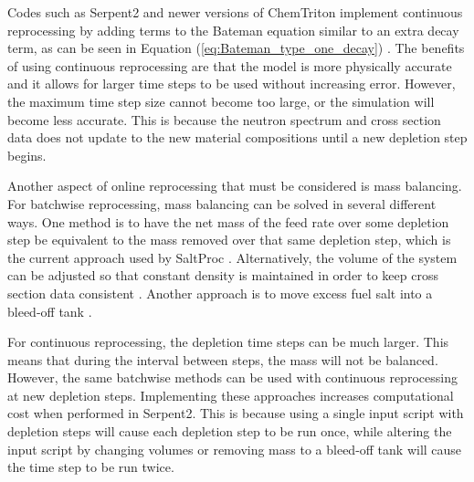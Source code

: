 Codes such as Serpent2 and newer versions of ChemTriton implement continuous reprocessing by adding terms to the Bateman equation similar to an extra decay term, as can be seen in Equation (\ref{eq:Bateman_type_one_decay}) \cite{aufiero_extended_2013, jr_vicente_valdez_modeling_2020}. The benefits of using continuous reprocessing are that the model is more physically accurate and it allows for larger time steps to be used without increasing error. However, the maximum time step size cannot become too large, or the simulation will become less accurate. This is because the neutron spectrum and cross section data does not update to the new material compositions until a new depletion step begins. 

Another aspect of online reprocessing that must be considered is mass balancing. For batchwise reprocessing, mass balancing can be solved in several different ways. One method is to have the net mass of the feed rate over some depletion step be equivalent to the mass removed over that same depletion step, which is the current approach used by SaltProc \cite{rykhlevskii_modeling_2019}. Alternatively, the volume of the system can be adjusted so that constant density is maintained in order to keep cross section data consistent \cite{ridley_method_2017}. Another approach is to move excess fuel salt into a bleed-off tank \cite{ridley_method_2017}.

For continuous reprocessing, the depletion time steps can be much larger. This means that during the interval between steps, the mass will not be balanced. However, the same batchwise methods can be used with continuous reprocessing at new depletion steps. Implementing these approaches increases computational cost when performed in Serpent2. This is because using a single input script with depletion steps will cause each depletion step to be run once, while altering the input script by changing volumes or removing mass to a bleed-off tank will cause the time step to be run twice.

